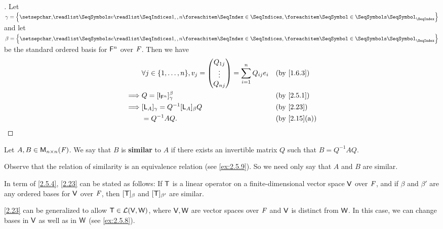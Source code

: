 \begin{proof}[]
  Let \(\gamma = \set{\seq{v}{1,,n}}\) and let \(\beta = \set{\seq{e}{1,,n}}\) be the standard ordered basis for \(\mathsf{F}^n\) over \(\mathit{F}\).
  Then we have
  \begin{align*}
             & \forall j \in \set{1, \dots, n}, v_j = \begin{pmatrix}
                                                        Q_{1 j} \\
                                                        \vdots  \\
                                                        Q_{n j}
                                                      \end{pmatrix} = \sum_{i = 1}^n Q_{i j} e_i &  & \text{(by \cref{1.6.3})} \\
    \implies & Q = [\IT_{\vs{F}^n}]_{\gamma}^{\beta}                  &  & \text{(by \cref{2.5.1})}                            \\
    \implies & [\L_A]_{\gamma} = Q^{-1} [\L_A]_{\beta} Q              &  & \text{(by \cref{2.23})}                             \\
             & = Q^{-1} A Q.                                          &  & \text{(by \cref{2.15}(a))}
  \end{align*}
\end{proof}

\begin{defn}\label{2.5.4}
  Let \(A, B \in \mathsf{M}_{{n} \times n}({\mathit{F}})\).
  We say that \(B\) is \textbf{similar} to \(A\) if there exists an invertible matrix \(Q\) such that \(B = Q^{-1} A Q\).
\end{defn}

\begin{note}
  Observe that the relation of similarity is an equivalence relation
  (see \cref{ex:2.5.9}).
  So we need only say that \(A\) and \(B\) are similar.
\end{note}

\begin{note}
  In term of \cref{2.5.4}, \cref{2.23} can be stated as follows:
  If \(\mathsf{T}\) is a linear operator on a finite-dimensional vector space \(\mathsf{V}\) over \(\mathit{F}\), and if \(\beta\) and \(\beta'\) are any ordered bases for \(\mathsf{V}\) over \(\mathit{F}\), then \([\mathsf{T}]_{\beta}\) and \([\mathsf{T}]_{\beta'}\) are similar.
\end{note}

\begin{note}
  \cref{2.23} can be generalized to allow \(\mathsf{T} \in \mathcal{L}(\mathsf{V}, \mathsf{W})\), where \(\mathsf{V}, \mathsf{W}\) are vector spaces over \(\mathit{F}\) and \(\mathsf{V}\) is distinct from \(\mathsf{W}\).
  In this case, we can change bases in \(\mathsf{V}\) as well as in \(\mathsf{W}\)
  (see \cref{ex:2.5.8}).
\end{note}

\exercisesection

\begin{ex}\label{ex:2.5.8}

\end{ex}

\begin{ex}\label{ex:2.5.9}

\end{ex}

\begin{ex}\label{ex:2.5.11}

\end{ex}
